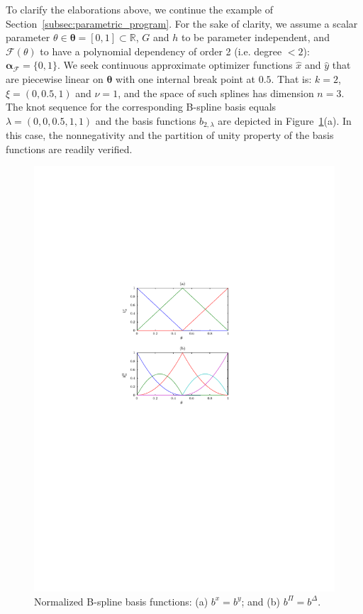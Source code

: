 \documentclass{article}
\newcommand{\R}{\mathbb{R}}         %
\newcommand{\ppar}{\theta}                          %
\newcommand{\Ppar}{{\bm{\theta}}}                   %
\newcommand{\calF}{\mathcal{F}}                     %
\newcommand{\bx}{b^x}               %
\newcommand{\by}{b^y}               %
\newcommand{\Alpha}{\bm{\alpha}}    %
\newcommand{\bPi}{b^\Pi}                %
\newcommand{\bDelta}{b^\Delta}          %
\begin{document}
To clarify the elaborations above, we continue the example of Section~\ref{subsec:parametric_program}. For the sake of clarity, we assume a scalar parameter $\ppar\in\Ppar=[0,1]\subset\R$, $G$ and $h$ to be parameter independent, and $\calF(\ppar)$ to have a polynomial dependency of order 2 (i.e. degree $<2$): $\Alpha_\calF = \{0,1\}$. We seek continuous approximate optimizer functions $\hat{x}$ and $\hat{y}$ that are piecewise linear on $\Ppar$ with one internal break point at $0.5$. That is: $k=2$, $\xi = (0, 0.5, 1)$ and $\nu = 1$, and the space of such splines has dimension $n=3$. The knot sequence for the corresponding  B-spline basis equals $\lambda=(0,0,0.5,1,1)$ and the basis functions  $b_{2,\lambda}$ are depicted in Figure~\ref{fig:exSDP}(a). In this case, the nonnegativity and the partition of unity property of the basis functions are readily verified.

\begin{figure}[t]
\begin{center}
\includegraphics[scale=1]{b_exSDP.pdf}
\end{center}
\caption{Normalized B-spline basis functions: (a) $\bx=\by$; and (b) $\bPi=\bDelta$.} %
\label{fig:exSDP}
\end{figure}
\end{document}
